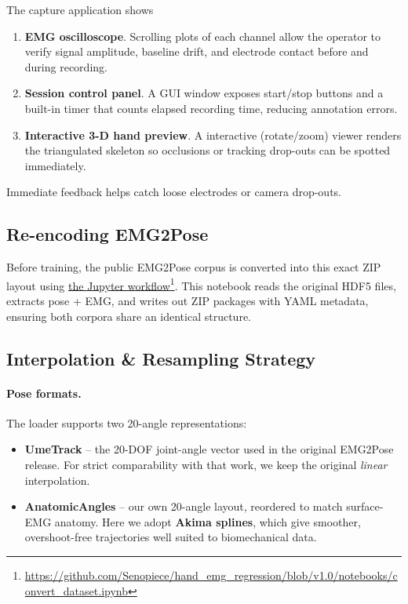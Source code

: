 The capture application shows

\begin{enumerate}[label=\alph*]
    \item \textbf{EMG oscilloscope}.
          Scrolling plots of each channel allow the operator to verify signal amplitude, baseline drift, and electrode contact before and during recording.
    \item \textbf{Session control panel}.
          A GUI window exposes start/stop buttons and a built-in timer that counts elapsed recording time, reducing annotation errors.
    \item \textbf{Interactive 3-D hand preview}.
          A interactive (rotate/zoom) viewer renders the triangulated skeleton so occlusions or tracking drop-outs can be spotted immediately.
\end{enumerate}

Immediate feedback helps catch loose electrodes or camera drop-outs.

\subsection{Re-encoding EMG2Pose}
Before training, the public EMG2Pose corpus is converted into this exact ZIP
layout using \href{https://github.com/Senopiece/hand_emg_regression/blob/v1.0/notebooks/convert_dataset.ipynb}{the Jupyter workflow}\footnote{\url{https://github.com/Senopiece/hand_emg_regression/blob/v1.0/notebooks/convert_dataset.ipynb}}. This notebook reads the original HDF5
files, extracts pose + EMG, and writes out ZIP packages with YAML metadata,
ensuring both corpora share an identical structure.

\subsection{Interpolation \& Resampling Strategy}

\paragraph{Pose formats.}
The loader supports two 20-angle representations:

\begin{itemize}
  \item \textbf{UmeTrack} -- the 20-DOF joint-angle vector used in the original
        EMG2Pose release. For strict comparability with that work, we keep the
        original \emph{linear} interpolation.
  \item \textbf{AnatomicAngles} -- our own 20-angle layout, reordered to match
        surface-EMG anatomy. Here we adopt \textbf{Akima splines}, which give
        smoother, overshoot-free trajectories well suited to biomechanical
        data.
\end{itemize}

